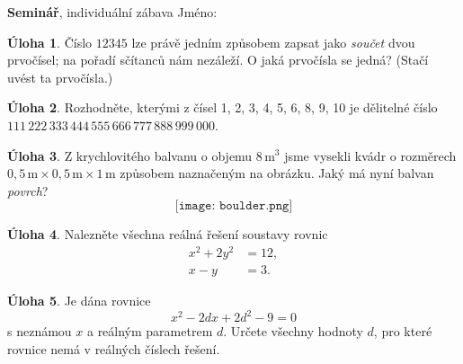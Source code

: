 \documentclass[12pt,a5paper]{article}
\theoremstyle{definition}
\newtheorem{uloha}{Úloha}
\begin{document}
\noindent \textbf{Seminář}, individuální zábava\hfill
Jméno: \hskip4cm\

\begin{uloha}
Číslo $12345$ lze právě jedním způsobem zapsat jako \emph{součet} dvou prvočísel; na pořadí sčítanců nám nezáleží. O jaká prvočísla se jedná? (Stačí uvést ta prvočísla.)
\end{uloha}

\vfil

\begin{uloha}
Rozhodněte, kterými z čísel 1, 2, 3, 4, 5, 6, 8, 9, 10 je dělitelné číslo
$
111\,222\,333\,444\,555\,666\,777\,888\,999\,000
$.
\end{uloha}

\vfil

\begin{uloha}
Z krychlovitého balvanu o objemu $8\,\mathrm{m}^3$ jsme vysekli kvádr o rozměrech $0{,}5\,\mathrm{m} \times 0{,}5\,\mathrm{m} \times 1\,\mathrm{m}$ způsobem naznačeným na obrázku. Jaký má nyní balvan \emph{povrch}?
\[\texttt{[image: boulder.png]}\]
\end{uloha}

\eject

\begin{uloha}
Nalezněte všechna reálná řešení soustavy rovnic
\begin{align*}
x^2 + 2y^2 &= 12,\\
x - y &= 3.
\end{align*}
\end{uloha}

\vfil

\begin{uloha}
Je dána rovnice
\[ x^2 - 2 d x + 2 d^2 - 9 = 0 \]
s neznámou $x$ a reálným parametrem $d$. Určete všechny hodnoty $d$, pro které rovnice nemá v reálných číslech řešení.
\end{uloha}
\end{document}
